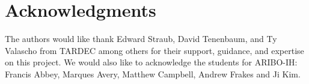 \section{Acknowledgments}\label{acknowledgments}
The authors would like thank Edward Straub, David Tenenbaum, and Ty Valascho from TARDEC among others for their support, guidance, and expertise on this project. We would also like to acknowledge the students for ARIBO-IH: Francis Abbey, Marques Avery, Matthew Campbell, Andrew Frakes and Ji Kim.